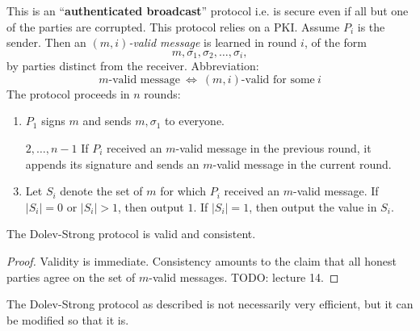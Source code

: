 \begin{prcl}
This is an ``\textbf{authenticated broadcast}'' protocol i.e. is secure even if all but one of the parties are corrupted.
This protocol relies on a PKI.
Assume $P_i$ is the sender.
Then an \textit{$(m, i)$-valid message} is learned in round $i$, of the form
\[
    m, \sigma_1, \sigma_2, \dots, \sigma_i,
\]
by parties distinct from the receiver.
Abbreviation:
\[
    m\text{-valid message}~\iff~(m, i)\text{-valid for some}~i
\]
The protocol proceeds in $n$ rounds:
\begin{enumerate}
\item 
$P_1$ signs $m$ and sends $m, \sigma_1$ to everyone.
\item[$2, \dots, n-1$]
If $P_i$ received an $m$-valid message in the previous round, it appends its signature and sends an $m$-valid message in the current round.
\item 
Let $S_i$ denote the set of $m$ for which $P_i$ received an $m$-valid message.
If $|S_i| = 0$ or $|S_i| > 1$, then output $1$.
If $|S_i| = 1$, then output the value in $S_i$.
\end{enumerate}
\end{prcl}

\begin{lem}
The Dolev-Strong protocol is valid and consistent.
\end{lem}
\begin{proof}
Validity is immediate.
Consistency amounts to the claim that all honest parties agree on the set of $m$-valid messages. TODO: lecture 14.
\end{proof}

The Dolev-Strong protocol as described is not necessarily very efficient, but it can be modified so that it is.
